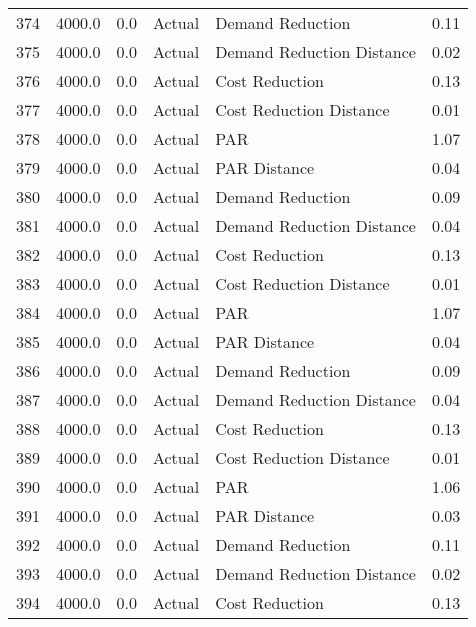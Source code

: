 \begin{longtable}{lrrllr}
374  &       4000.0 &     0.0 &         Actual &           Demand Reduction &   0.11 \\
375  &       4000.0 &     0.0 &         Actual &  Demand Reduction Distance &   0.02 \\
376  &       4000.0 &     0.0 &         Actual &             Cost Reduction &   0.13 \\
377  &       4000.0 &     0.0 &         Actual &    Cost Reduction Distance &   0.01 \\
378  &       4000.0 &     0.0 &         Actual &                        PAR &   1.07 \\
379  &       4000.0 &     0.0 &         Actual &               PAR Distance &   0.04 \\
380  &       4000.0 &     0.0 &         Actual &           Demand Reduction &   0.09 \\
381  &       4000.0 &     0.0 &         Actual &  Demand Reduction Distance &   0.04 \\
382  &       4000.0 &     0.0 &         Actual &             Cost Reduction &   0.13 \\
383  &       4000.0 &     0.0 &         Actual &    Cost Reduction Distance &   0.01 \\
384  &       4000.0 &     0.0 &         Actual &                        PAR &   1.07 \\
385  &       4000.0 &     0.0 &         Actual &               PAR Distance &   0.04 \\
386  &       4000.0 &     0.0 &         Actual &           Demand Reduction &   0.09 \\
387  &       4000.0 &     0.0 &         Actual &  Demand Reduction Distance &   0.04 \\
388  &       4000.0 &     0.0 &         Actual &             Cost Reduction &   0.13 \\
389  &       4000.0 &     0.0 &         Actual &    Cost Reduction Distance &   0.01 \\
390  &       4000.0 &     0.0 &         Actual &                        PAR &   1.06 \\
391  &       4000.0 &     0.0 &         Actual &               PAR Distance &   0.03 \\
392  &       4000.0 &     0.0 &         Actual &           Demand Reduction &   0.11 \\
393  &       4000.0 &     0.0 &         Actual &  Demand Reduction Distance &   0.02 \\
394  &       4000.0 &     0.0 &         Actual &             Cost Reduction &   0.13 \\

\end{longtable}
